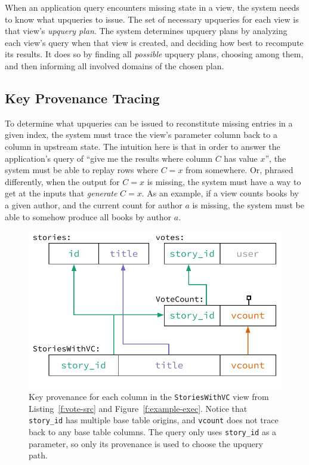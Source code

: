 When an application query encounters missing state in a view, the system needs
to know what upqueries to issue. The set of necessary upqueries for each view is
that view's \textit{upquery plan}. The system determines upquery plans by
analyzing each view's query when that view is created, and deciding how best
to recompute its results. It does so by finding all \emph{possible} upquery
plans, choosing among them, and then informing all involved domains of the
chosen plan.

\subsection{Key Provenance Tracing}

To determine what upqueries can be issued to reconstitute missing entries in a
given index, the system must trace the view's parameter column back to a column
in upstream state. The intuition here is that in order to answer the
application's query of ``give me the results where column $C$ has value $x$'',
the system must be able to replay rows where $C = x$ from somewhere. Or, phrased
differently, when the output for $C = x$ is missing, the system must have a way
to get at the inputs that \emph{generate} $C = x$. As an example, if a view
counts books by a given author, and the current count for author $a$ is missing,
the system must be able to somehow produce all books by author $a$.

\begin{figure}[t]
  \centering
  \includegraphics{diagrams/Key Provenance.pdf}
  \caption{Key provenance for each column in the \texttt{StoriesWithVC} view
  from Listing~\ref{f:vote-src} and Figure~\ref{f:example-exec}. Notice that
  \texttt{story\_id} has multiple base table origins, and \texttt{vcount} does
  not trace back to any base table columns. The query only uses
  \texttt{story\_id} as a parameter, so only its provenance is used to choose
  the upquery path.}
  \label{f:key-prov}
\end{figure}

